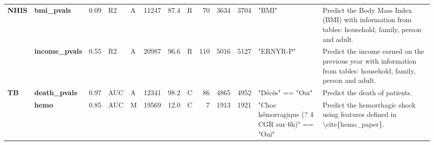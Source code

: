 \begin{tabular}{llrllrrlrrrll}
\textbf{NHIS} & \textbf{bmi\_pvals} &   0.09 &     R2 &         A &   11247 &   87.4 &    R &                   70 &             3634 &            3704 &                                                                                                                                                                                                                                                                                                                                                                                                                                                                                 "BMI" &               Predict the Body Mass Index (BMI) with information from tables: household, family, person and adult. \\
     & \textbf{income\_pvals} &   0.55 &     R2 &         A &   20987 &   96.6 &    R &                  110 &             5016 &            5127 &                                                                                                                                                                                                                                                                                                                                                                                                                                                                             "ERNYR-P" &  Predict the income earned on the previous year with information from tables: household, family, person and adult. \\
\textbf{TB} & \textbf{death\_pvals} &   0.97 &    AUC &         A &   12341 &   98.2 &    C &                   86 &             4865 &            4952 &                                                                                                                                                                                                                                                                                                                                                                                                                                                                      "Décès" == "Oui" &                                                                                     Predict the death of patients. \\
     & \textbf{hemo} &   0.85 &    AUC &         M &   19569 &   12.0 &    C &                    7 &             1913 &            1921 &                                                                                                                                                                                                                                                                                                                                                                                                                                         "Choc hémorragique (? 4 CGR sur 6h)" == "Oui" &                                         Predict the hemorrhagic shock using features defined in \textbackslash cite\{hemo\_paper\}. \\

\end{tabular}
